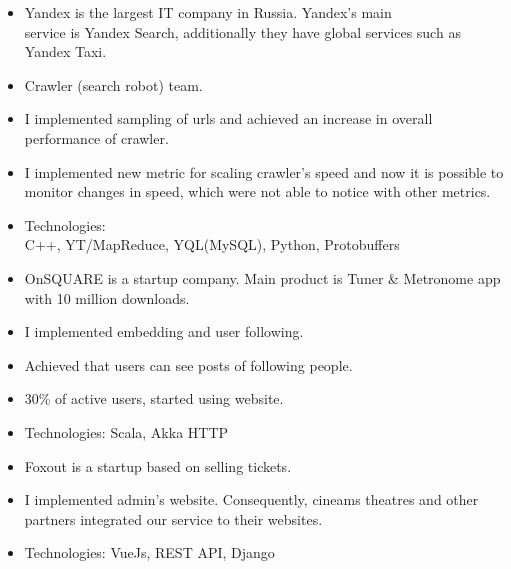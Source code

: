 \documentclass[10pt,a4paper,ragged2e]{altacv}
\begin{document}
\begin{itemize}
\item Yandex is the largest IT company in Russia. Yandex's main \\ service is Yandex Search, additionally they have global services such as Yandex Taxi. 
\smallskip
\item Crawler (search robot) team. 
\item I implemented sampling of urls and achieved an increase in overall performance of crawler. 
\item I implemented new metric for scaling crawler's speed and now it is possible to monitor changes in speed, which were not able to notice with other metrics. 
\item Technologies: \\ C++, YT/MapReduce, YQL(MySQL), Python, Protobuffers
\end{itemize}

\divider

\begin{itemize}
\item OnSQUARE is a startup company. Main product is Tuner \& Metronome app with 10 million downloads.
\smallskip
\item I implemented embedding and user following.
\item Achieved that users can see posts of following people.
\item 30\% of active users, started using website.
\item Technologies: Scala, Akka HTTP
\end{itemize}

\divider

\begin{itemize}
\item Foxout is a startup based on selling tickets.
\smallskip
\item I implemented admin's website. Consequently, cineams theatres and other partners integrated our service to their websites. 
\item Technologies: VueJs, REST API, Django
\end{itemize}



\end{document}
